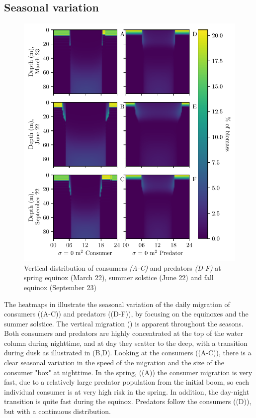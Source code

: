 \subsection{Seasonal variation}
\begin{figure}[H]
\includegraphics{plots/total_heatmap.pdf}
\caption{Vertical distribution of consumers \emph{(A-C)} and predators \emph{(D-F)} at spring equinox (March 22), summer solstice (June 22) and fall equinox (September 23)}
\label{fig:heatmap_total}
\end{figure}
The heatmaps in  illustrate the seasonal variation of the daily migration of consumers ((A-C)) and predators ((D-F)), by focusing on the equinoxes and the summer solstice.
The vertical migration () is apparent throughout the seasons. Both consumers and predators are highly concentrated at the top of the water column during nighttime, and at day they scatter to the deep, with a transition during dusk as illustrated in (B,D). Looking at the consumers ((A-C)), there is a clear seasonal variation in the speed of the migration and the size of the consumer "box" at nighttime. In the spring, ((A)) the consumer migration is very fast, due to a relatively large predator population from the initial boom, so each individual consumer is at very high risk in the spring. In addition, the day-night transition is quite fast during the equinox. Predators follow the consumers ((D)), but with a continuous distribution.
